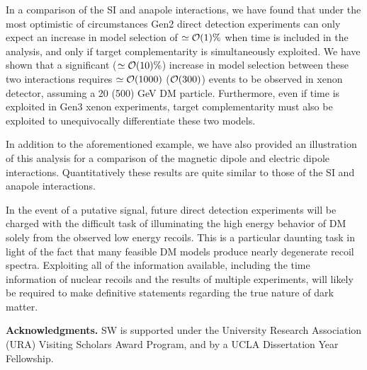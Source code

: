 \documentclass[11pt]{article}
\begin{document}
 
In a comparison of the SI and anapole interactions, we have found that under the most optimistic of circumstances Gen2 direct detection experiments can only expect an increase in model selection of $\simeq {\cal O}(1)\%$ when time is included in the analysis, and only if target complementarity is simultaneously exploited. We have shown that a significant ($\simeq {\cal O}(10)\%$) increase in model selection between these two interactions requires $\simeq {\cal O}(1000)$ (${\cal O}(300)$) events to be observed in xenon detector, assuming a 20 (500) GeV DM particle. Furthermore, even if time is exploited in Gen3 xenon experiments, target complementarity must also be exploited to unequivocally differentiate these two models.

In addition to the aforementioned example, we have also provided an illustration of this analysis for a comparison of the magnetic dipole and electric dipole interactions. Quantitatively these results are quite similar to those of the SI and anapole interactions.

In the event of a putative signal, future direct detection experiments will be charged with the difficult task of illuminating the high energy behavior of DM solely from the observed low energy recoils. This is a particular daunting task in light of the fact that many feasible DM models produce nearly degenerate recoil spectra. Exploiting all of the information available, including the time information of nuclear recoils and the results of multiple experiments, will likely be required to make definitive statements regarding the true nature of dark matter.


\bigskip

\textbf{Acknowledgments.} SW is supported under the University Research Association (URA) Visiting Scholars Award Program, and by a UCLA Dissertation Year Fellowship. %




\end{document}
